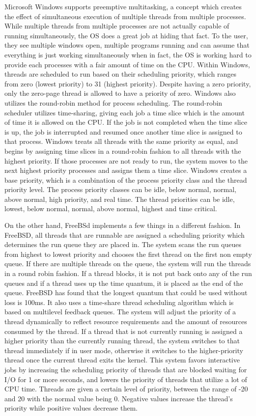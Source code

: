 \documentclass[letterpaper,10pt,draftclsnofoot,onecolumn,titlepage]{IEEEtran}
\begin{document}
		Microsoft Windows supports preemptive multitasking, a concept which creates the effect of simultaneous execution of multiple threads from multiple processes. While multiple threads from multiple processes are not actually capable of running simultaneously, the OS does a great job at hiding that fact. To the user, they see multiple windows open, multiple programs running and can assume that everything is just working simultaneously when in fact, the OS is working hard to provide each processes with a fair amount of time on the CPU. Within Windows, threads are scheduled to run based on their scheduling priority, which ranges from zero (lowest priority) to 31 (highest priority). Despite having a zero priority, only the zero-page thread is allowed to have a priority of zero. Windows also utilizes the round-robin method for process scheduling. The round-robin scheduler utilizes time-sharing, giving each job a time slice which is the amount of time it is allowed on the CPU. If the job is not completed when the time slice is up, the job is interrupted and resumed once another time slice is assigned to that process. Windows treats all threads with the same priority as equal, and begins by assigning time slices in a round-robin fashion to all threads with the highest priority. If those processes are not ready to run, the system moves to the next highest priority processes and assigns them a time slice. Windows creates a base priority, which is a combination of the process priority class and the thread priority level. The process priority classes can be idle, below normal, normal, above normal, high priority, and real time. The thread priorities can be idle, lowest, below normal, normal, above normal, highest and time critical.
		\par
		On the other hand, FreeBSd implements a few things in a different fashion. In FreeBSD, all threads that are runnable are assigned a scheduling priority which determines the run queue they are placed in. The system scans the run queues from highest to lowest priority and chooses the first thread on the first non empty queue. If there are multiple threads on the queue, the system will run the threads in a round robin fashion. If a thread blocks, it is not put back onto any of the run queues and if a thread uses up the time quantum, it is placed as the end of the queue. FreeBSD has found that the longest quantum that could be used without loss is 100ms. It also uses a time-share thread scheduling algorithm which is based on multilevel feedback queues. The system will adjust the priority of a thread dynamically to reflect resource requirements and the amount of resources consumed by the thread. If a thread that is not currently running is assigned a higher priority than the currently running thread, the system switches to that thread immediately if in user mode, otherwise it switches to the higher-priority thread once the current thread exits the kernel. This system favors interactive jobs by increasing the scheduling priority of threads that are blocked waiting for I/O for 1 or more seconds, and lowers the priority of threads that utilize a lot of CPU time. Threads are given a certain level of priority, between the range of -20 and 20 with the normal value being 0. Negative values increase the thread’s priority while positive values decrease them.
\end{document}
